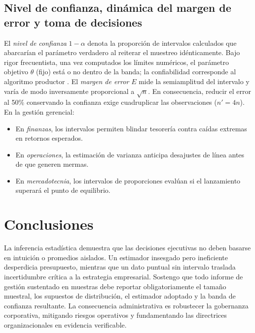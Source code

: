 \subsection{Nivel de confianza, dinámica del margen de error y toma de decisiones}
El \textit{nivel de confianza} $1-\alpha$ denota la proporción de intervalos calculados que abarcarían el parámetro verdadero al reiterar el muestreo idénticamente. Bajo rigor frecuentista, una vez computados los límites numéricos, el parámetro objetivo $\theta$ (fijo) está o no dentro de la banda; la confiabilidad corresponde al algoritmo productor \citep{wackerly2010}. El \textit{margen de error} $E$ mide la semiamplitud del intervalo y varía de modo inversamente proporcional a $\sqrt{n}$. En consecuencia, reducir el error al 50\% conservando la confianza exige cuadruplicar las observaciones ($n' = 4n$).
En la gestión gerencial:
\begin{itemize}\setlength{\itemsep}{0.5pt}\setlength{\parsep}{0pt}\setlength{\topsep}{0.5pt}
  \item En \textit{finanzas}, los intervalos permiten blindar tesorería contra caídas extremas en retornos esperados.
  \item En \textit{operaciones}, la estimación de varianza anticipa desajustes de línea antes de que generen mermas.
  \item En \textit{mercadotecnia}, los intervalos de proporciones evalúan si el lanzamiento superará el punto de equilibrio.
\end{itemize}

\section{Conclusiones}
La inferencia estadística demuestra que las decisiones ejecutivas no deben basarse en intuición o promedios aislados. Un estimador insesgado pero ineficiente desperdicia presupuesto, mientras que un dato puntual sin intervalo traslada incertidumbre crítica a la estrategia empresarial. Sostengo que todo informe de gestión sustentado en muestras debe reportar obligatoriamente el tamaño muestral, los supuestos de distribución, el estimador adoptado y la banda de confianza resultante. La consecuencia administrativa es robustecer la gobernanza corporativa, mitigando riesgos operativos y fundamentando las directrices organizacionales en evidencia verificable.

\clearpage

